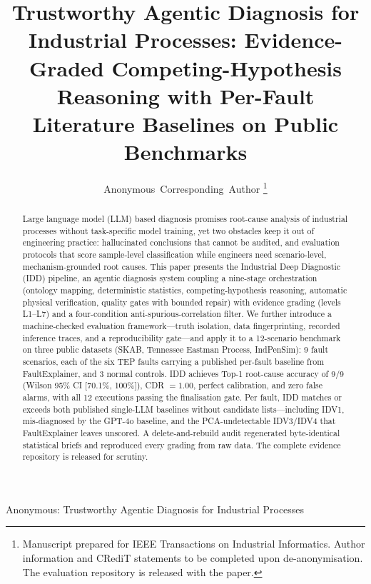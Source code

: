 \documentclass[journal]{IEEEtran}
\begin{document}
\title{Trustworthy Agentic Diagnosis for Industrial Processes: Evidence-Graded Competing-Hypothesis Reasoning with Per-Fault Literature Baselines on Public Benchmarks}

\author{Anonymous~Corresponding~Author%
\thanks{Manuscript prepared for IEEE Transactions on Industrial Informatics. Author information and CRediT statements to be completed upon de-anonymisation. The evaluation repository is released with the paper.}%
}

%
{Anonymous: Trustworthy Agentic Diagnosis for Industrial Processes}

\maketitle

\begin{abstract}
Large language model (LLM) based diagnosis promises root-cause analysis of industrial processes without task-specific model training, yet two obstacles keep it out of engineering practice: hallucinated conclusions that cannot be audited, and evaluation protocols that score sample-level classification while engineers need scenario-level, mechanism-grounded root causes. This paper presents the Industrial Deep Diagnostic (IDD) pipeline, an agentic diagnosis system coupling a nine-stage orchestration (ontology mapping, deterministic statistics, competing-hypothesis reasoning, automatic physical verification, quality gates with bounded repair) with evidence grading (levels L1--L7) and a four-condition anti-spurious-correlation filter. We further introduce a machine-checked evaluation framework---truth isolation, data fingerprinting, recorded inference traces, and a reproducibility gate---and apply it to a 12-scenario benchmark on three public datasets (SKAB, Tennessee Eastman Process, IndPenSim): 9 fault scenarios, each of the six TEP faults carrying a published per-fault baseline from FaultExplainer, and 3 normal controls. IDD achieves Top-1 root-cause accuracy of 9/9 (Wilson 95\% CI [70.1\%, 100\%]), CDR $=1.00$, perfect calibration, and zero false alarms, with all 12 executions passing the finalisation gate. Per fault, IDD matches or exceeds both published single-LLM baselines without candidate lists---including IDV1, mis-diagnosed by the GPT-4o baseline, and the PCA-undetectable IDV3/IDV4 that FaultExplainer leaves unscored. A delete-and-rebuild audit regenerated byte-identical statistical briefs and reproduced every grading from raw data. The complete evidence repository is released for scrutiny.
\end{abstract}
\end{document}
